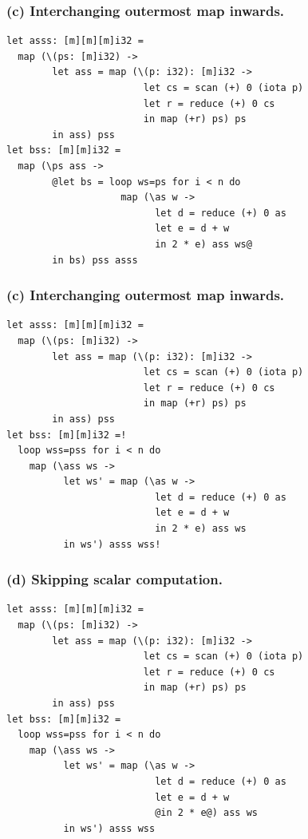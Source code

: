 \documentclass[rgb,dvipsnames]{beamer}
\begin{document}
\begin{frame}[t,fragile]
\frametitle{(c) Interchanging outermost map inwards.}

\begin{lstlisting}[basicstyle=\sffamily\footnotesize]
let asss: [m][m][m]i32 =
  map (\(ps: [m]i32) ->
        let ass = map (\(p: i32): [m]i32 ->
                        let cs = scan (+) 0 (iota p)
                        let r = reduce (+) 0 cs
                        in map (+r) ps) ps
        in ass) pss
let bss: [m][m]i32 =
  map (\ps ass ->
        @let bs = loop ws=ps for i < n do
                    map (\as w ->
                          let d = reduce (+) 0 as
                          let e = d + w
                          in 2 * e) ass ws@
        in bs) pss asss
\end{lstlisting}
\end{frame}


\begin{frame}[t,fragile]
\frametitle{(c) Interchanging outermost map inwards.}

\begin{lstlisting}[basicstyle=\sffamily\footnotesize]
let asss: [m][m][m]i32 =
  map (\(ps: [m]i32) ->
        let ass = map (\(p: i32): [m]i32 ->
                        let cs = scan (+) 0 (iota p)
                        let r = reduce (+) 0 cs
                        in map (+r) ps) ps
        in ass) pss
let bss: [m][m]i32 =!
  loop wss=pss for i < n do
    map (\ass ws ->
          let ws' = map (\as w ->
                          let d = reduce (+) 0 as
                          let e = d + w
                          in 2 * e) ass ws
          in ws') asss wss!
\end{lstlisting}
\end{frame}

\begin{frame}[t,fragile]
\frametitle{(d) Skipping scalar computation.}

\begin{lstlisting}[basicstyle=\sffamily\footnotesize]
let asss: [m][m][m]i32 =
  map (\(ps: [m]i32) ->
        let ass = map (\(p: i32): [m]i32 ->
                        let cs = scan (+) 0 (iota p)
                        let r = reduce (+) 0 cs
                        in map (+r) ps) ps
        in ass) pss
let bss: [m][m]i32 =
  loop wss=pss for i < n do
    map (\ass ws ->
          let ws' = map (\as w ->
                          let d = reduce (+) 0 as
                          let e = d + w
                          @in 2 * e@) ass ws
          in ws') asss wss
\end{lstlisting}
\end{frame}
\end{document}
